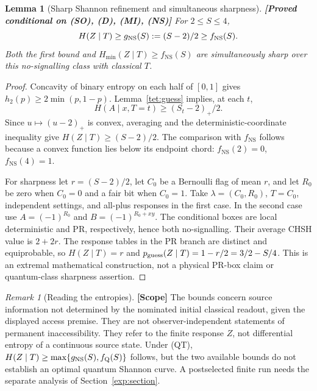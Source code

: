 \documentclass[11pt,a4paper]{article}
\newtheorem{lemma}[theorem]{Lemma}
\theoremstyle{definition}
\theoremstyle{remark}\newtheorem{remark}[theorem]{Remark}
\newcommand{\status}[1]{\textbf{[#1]}\quad}
\newcommand{\fNS}{f_{\mathrm{NS}}}
\newcommand{\fQ}{f_{\mathrm{Q}}}
\begin{document}
\begin{lemma}[Sharp Shannon refinement and simultaneous sharpness]\label{tet:sharpShannon}
\status{Proved conditional on (SO), (D), (MI), (NS)}
For $2\le S\le4$,
\begin{equation}\label{tet:linearShannon}
 H(Z\mid T)\ge g_{\rm NS}(S):=(S-2)/2\ge\fNS(S).
\end{equation}
Both the first bound and $H_{\min}(Z\mid T)\ge\fNS(S)$ are simultaneously sharp over this no-signalling class with classical $T$.
\end{lemma}
\begin{proof}
Concavity of binary entropy on each half of $[0,1]$ gives
$h_2(p)\ge2\min(p,1-p)$. Lemma~\ref{tet:guess} implies, at each $t$,
\[
 H(A\mid x,T=t)\ge (S_t-2)_+/2.
\]
Since $u\mapsto(u-2)_+$ is convex, averaging and the deterministic-coordinate inequality give $H(Z\mid T)\ge(S-2)/2$. The comparison with $\fNS$ follows because a convex function lies below its endpoint chord: $\fNS(2)=0$, $\fNS(4)=1$.

For sharpness let $r=(S-2)/2$, let $C_0$ be a Bernoulli flag of mean $r$, and let $R_0$ be zero when $C_0=0$ and a fair bit when $C_0=1$. Take $\lambda=(C_0,R_0)$, $T=C_0$, independent settings, and all-plus responses in the first case. In the second case use
$A=(-1)^{R_0}$ and $B=(-1)^{R_0+xy}$.
The conditional boxes are local deterministic and PR, respectively, hence both no-signalling. Their average CHSH value is $2+2r$.
The response tables in the PR branch are distinct and equiprobable, so
$H(Z\mid T)=r$ and $p_{\rm guess}(Z\mid T)=1-r/2=3/2-S/4$.
This is an extremal mathematical construction, not a physical PR-box claim or quantum-class sharpness assertion.
\end{proof}

\begin{remark}[Reading the entropies]\label{tet:reading}
\status{Scope}
The bounds concern source information not determined by the nominated initial classical readout, given the displayed access premise. They are not observer-independent statements of permanent inaccessibility. They refer to the finite response $Z$, not differential entropy of a continuous source state. Under (QT), $H(Z\mid T)\ge\max\{g_{\rm NS}(S),\fQ(S)\}$ follows, but the two available bounds do not establish an optimal quantum Shannon curve. A postselected finite run needs the separate analysis of Section~\ref{exp:section}.
\end{remark}
\end{document}
